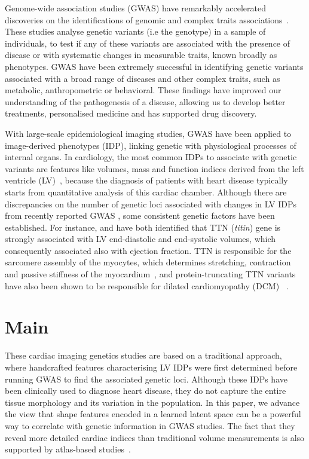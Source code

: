 Genome-wide association studies (GWAS) have remarkably accelerated discoveries on the identifications of genomic and complex traits associations~\cite{ref_gwas_review}. These studies analyse genetic variants (i.e the genotype) in a sample of individuals, to test if any of these variants are associated with the presence of disease or with systematic changes in measurable traits, known broadly as phenotypes. GWAS have been extremely successful in identifying genetic variants associated with a broad range of diseases and other complex traits, such as metabolic, anthropometric or behavioral. These findings have improved our understanding of the pathogenesis of a disease, allowing us to develop better treatments, personalised medicine and has supported drug discovery.

With large-scale epidemiological imaging studies, GWAS have been applied to image-derived phenotypes (IDP), linking genetic with physiological processes of internal organs. In cardiology, the most common IDPs to associate with genetic variants are features like volumes, mass and function indices derived from the left ventricle (LV)~\cite{ref_nayaung, ref_biffi}, because the diagnosis of patients with heart disease typically starts from quantitative analysis of this cardiac chamber. Although there are discrepancies on the number of genetic loci associated with changes in LV IDPs from recently reported GWAS \cite{ref_nayaung, ref_pirruccello, ref_biffi}, some consistent genetic factors have been established. 
For instance, \cite{ref_nayaung} and \cite{ref_pirruccello} have both identified that TTN ({\em titin}) gene is strongly associated with LV end-diastolic and end-systolic volumes, which consequently associated also with ejection fraction. TTN is responsible for the sarcomere assembly of the myocytes, which determines stretching, contraction and passive stiffness of the myocardium~\cite{granzier_giant_2004}, and protein-truncating TTN variants have also been shown to be responsible for dilated cardiomyopathy (DCM) ~\cite{tayal_phenotype_2017}.
\section*{Main}
These cardiac imaging genetics studies are based on a traditional approach, where handcrafted features characterising LV IDPs were first determined before running GWAS to find the associated genetic loci. Although these IDPs have been clinically used to diagnose heart disease, they do not capture the entire tissue morphology and its variation in the population. In this paper, we advance the view that shape features encoded in a learned latent space can be a powerful way to correlate with genetic information in GWAS studies. The fact that they reveal more detailed cardiac indices than traditional volume measurements is also supported by atlas-based studies~\cite{gilbert_independent_2019, medrano-gracia_left_2014}.

